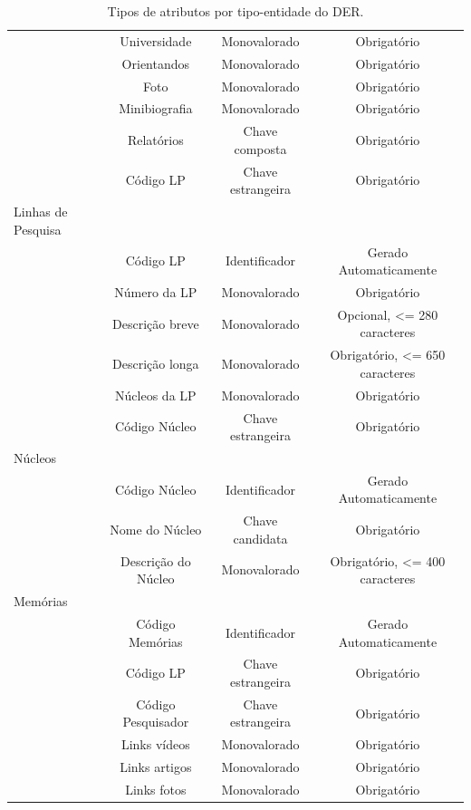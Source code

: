 \documentclass[11pt]{../../classes/ifscarticle}
\begin{document}
\begin{table}[h]
\begin{tabular}{l|c|c|c|}
                  & Universidade        & Monovalorado      & Obrigatório                                          \\
                  & Orientandos         & Monovalorado      & Obrigatório                                          \\
                  & Foto                & Monovalorado      & Obrigatório                                          \\
                  & Minibiografia       & Monovalorado      & Obrigatório                                          \\
                  & Relatórios          & Chave composta    & Obrigatório                                          \\
                  & Código LP           & Chave estrangeira & Obrigatório                                          \\
    \hline
    Linhas de Pesquisa \\
                  & Código LP       & Identificador     & Gerado Automaticamente         \\
                  & Número da LP    & Monovalorado      & Obrigatório                    \\
                  & Descrição breve & Monovalorado      & Opcional, <= 280 caracteres    \\
                  & Descrição longa & Monovalorado      & Obrigatório, <= 650 caracteres \\
                  & Núcleos da LP   & Monovalorado      & Obrigatório                    \\
                  & Código Núcleo   & Chave estrangeira & Obrigatório                    \\
    \hline
    Núcleos \\
                  & Código Núcleo       & Identificador     & Gerado Automaticamente         \\
                  & Nome do Núcleo      & Chave candidata   & Obrigatório                    \\
                  & Descrição do Núcleo & Monovalorado      & Obrigatório, <= 400 caracteres \\
    \hline
    Memórias \\
                  & Código Memórias     & Identificador     & Gerado Automaticamente \\
                  & Código LP           & Chave estrangeira & Obrigatório            \\
                  & Código Pesquisador  & Chave estrangeira & Obrigatório            \\
                  & Links vídeos        & Monovalorado      & Obrigatório            \\
                  & Links artigos       & Monovalorado      & Obrigatório            \\
                  & Links fotos         & Monovalorado      & Obrigatório            \\
    \hline
  \end{tabular}
  \caption{Tipos de atributos por tipo-entidade do DER.}
\end{table}




\end{document}
